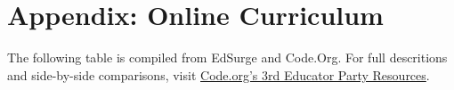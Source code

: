 
\chapter{Appendix: Online Curriculum} %

\label{AppendixTools} %


The following table is compiled from EdSurge\cite{edsurgetab} and Code.Org\cite{codeorgs}. For full descritions and side-by-side comparisons, visit \href{https://code.org/educate/3rdparty}{Code.org's 3rd Educator Party Resources}.
\footnotesize
